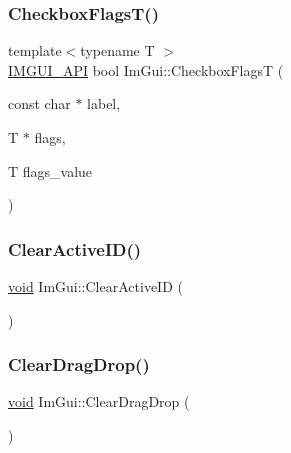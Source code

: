 \mbox{\label{namespaceImGui_a7d9caed9bd337c54cf2a9dbdf913db26}} 
\subsubsection{\texorpdfstring{Checkbox\+Flags\+T()}{CheckboxFlagsT()}}
{\footnotesize\ttfamily template$<$typename T $>$ \\
\hyperlink{imgui_8h_a43829975e84e45d1149597467a14bbf5}{I\+M\+G\+U\+I\+\_\+\+A\+PI} bool Im\+Gui\+::\+Checkbox\+FlagsT (\begin{DoxyParamCaption}\item[{const char $\ast$}]{label,  }\item[{T $\ast$}]{flags,  }\item[{T}]{flags\+\_\+value }\end{DoxyParamCaption})}

\mbox{\label{namespaceImGui_a17ff60ad1e2669130ac38a04d16eb354}} 
\subsubsection{\texorpdfstring{Clear\+Active\+I\+D()}{ClearActiveID()}}
{\footnotesize\ttfamily \hyperlink{imgui__impl__opengl3__loader_8h_ac668e7cffd9e2e9cfee428b9b2f34fa7}{void} Im\+Gui\+::\+Clear\+Active\+ID (\begin{DoxyParamCaption}{ }\end{DoxyParamCaption})}

\mbox{\label{namespaceImGui_adae8f94649956a2a717c00dbf81a5df9}} 
\subsubsection{\texorpdfstring{Clear\+Drag\+Drop()}{ClearDragDrop()}}
{\footnotesize\ttfamily \hyperlink{imgui__impl__opengl3__loader_8h_ac668e7cffd9e2e9cfee428b9b2f34fa7}{void} Im\+Gui\+::\+Clear\+Drag\+Drop (\begin{DoxyParamCaption}{ }\end{DoxyParamCaption})}

